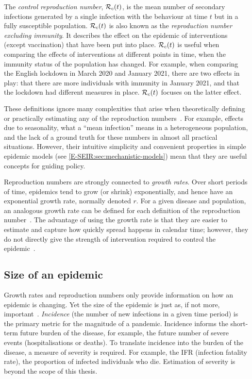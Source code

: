 \documentclass[thesis.tex]{subfiles}
\begin{document}
The \emph{control reproduction number}, $\mathcal{R}_{c}(t)$, is the mean number of secondary infections generated by a single infection with the behaviour at time $t$ but in a fully susceptible population.
$\mathcal{R}_{c}(t)$ is also known as the \emph{reproduction number excluding immunity}.
It describes the effect on the epidemic of interventions (except vaccination) that have been put into place.
$\mathcal{R}_{c}(t)$ is useful when comparing the effects of interventions at different points in time, when the immunity status of the population has changed.
For example, when comparing the English lockdown in March 2020 and January 2021, there are two effects in play: that there are more individuals with immunity in January 2021, and that the lockdown had different measures in place.
$\mathcal{R}_{c}(t)$ focuses on the latter effect.

These definitions ignore many complexities that arise when theoretically defining or practically estimating any of the reproduction numbers~\autocite{pellisEstimation}.
For example, effects due to seasonality, what a ``mean infection'' means in a heterogeneous population, and the lack of a ground truth for these numbers in almost all practical situations.
However, their intuitive simplicity and convenient properties in simple epidemic models (see \cref{E-SEIR:sec:mechanistic-models}) mean that they are useful concepts for guiding policy.

Reproduction numbers are strongly connected to \emph{growth rates}.
Over short periods of time, epidemics tend to grow (or shrink) exponentially, and hence have an exponential growth rate, normally denoted $r$.
For a given disease and population, an analogous growth rate can be defined for each definition of the reproduction number~\autocite{pellisEstimation,paragGrowthRates,wallingaGI}.
The advantage of using the growth rate is that they are easier to estimate and capture how quickly spread happens in calendar time; however, they do not directly give the strength of intervention required to control the epidemic~\autocite{royalSocietyRnumber}.

\subsection{Size of an epidemic}

Growth rates and reproduction numbers only provide information on how an epidemic is changing.
Yet the size of the epidemic is just as, if not more, important~\autocite{pellisEstimation}.
\emph{Incidence} (the number of new infections in a given time period) is the primary metric for the magnitude of a pandemic.
Incidence informs the short-term future burden of the disease, for example, the future number of severe events (hospitalisations or deaths).
To translate incidence into the burden of the disease, a measure of severity is required.
For example, the IFR (infection fatality rate), the proportion of infected individuals who die.
Estimation of severity is beyond the scope of this thesis.
\end{document}
